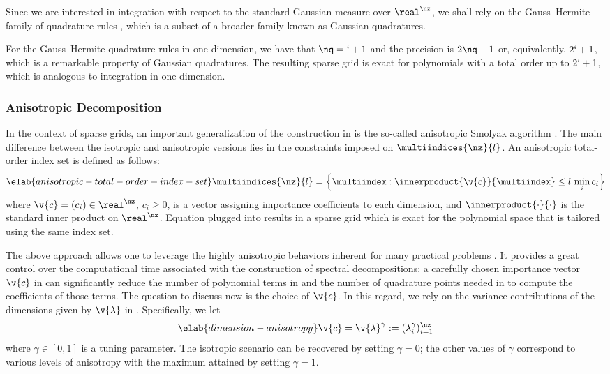 Since we are interested in integration with respect to the standard Gaussian
measure over $\real^\nz$, we shall rely on the Gauss--Hermite family of
quadrature rules \cite{maitre2010}, which is a subset of a broader family known
as Gaussian quadratures.

For the Gauss--Hermite quadrature rules in one dimension, we have that $\nq =
\lq + 1$ and the precision is $2 \nq - 1$ \cite{heiss2008} or, equivalently, $2
\lq + 1$, which is a remarkable property of Gaussian quadratures. The resulting
sparse grid is exact for polynomials with a total order up to $2 \lq + 1$, which
is analogous to integration in one dimension.

\subsubsection{Anisotropic Decomposition}

In the context of sparse grids, an important generalization of the construction
in  is the so-called anisotropic Smolyak algorithm
\cite{nobile2008}. The main difference between the isotropic and anisotropic
versions lies in the constraints imposed on $\multiindices{\nz}{l}$. An
anisotropic total-order index set is defined as follows:
\begin{equation} \elab{anisotropic-total-order-index-set}
  \multiindices{\nz}{l} = \left\{ \multiindex: \innerproduct{\v{c}}{\multiindex} \leq l \, \min_i c_i \right\}
\end{equation}
where $\v{c} = (c_i) \in \real^\nz$, $c_i \geq 0$, is a vector assigning
importance coefficients to each dimension, and $\innerproduct{\cdot}{\cdot}$ is
the standard inner product on $\real^\nz$. Equation
 plugged into 
results in a sparse grid which is exact for the polynomial space that is
tailored using the same index set.

The above approach allows one to leverage the highly anisotropic behaviors
inherent for many practical problems \cite{nobile2008}. It provides a great
control over the computational time associated with the construction of spectral
decompositions: a carefully chosen importance vector $\v{c}$ in
 can significantly reduce the number of
polynomial terms in  and the number of quadrature
points needed in  to compute the coefficients of
those terms. The question to discuss now is the choice of $\v{c}$. In this
regard, we rely on the variance contributions of the dimensions given by
$\v{\lambda}$ in . Specifically, we let
\begin{equation} \elab{dimension-anisotropy}
  \v{c} = \v{\lambda}^\gamma := (\lambda_i^\gamma)_{i = 1}^\nz
\end{equation}
where $\gamma \in [0, 1]$ is a tuning parameter. The isotropic scenario can be
recovered by setting $\gamma = 0$; the other values of $\gamma$ correspond to
various levels of anisotropy with the maximum attained by setting $\gamma = 1$.

